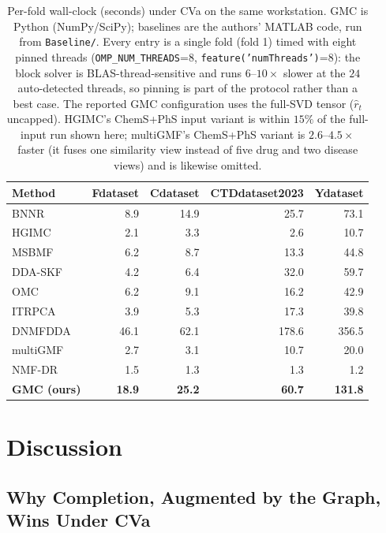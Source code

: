 \documentclass[webpdf,modern,large]{oup-authoring-template}
\begin{document}
\begin{table}[tb]
\centering
\caption{Per-fold wall-clock (seconds) under CVa on the same workstation. GMC is Python (NumPy/SciPy); baselines are the authors' MATLAB code, run from \texttt{Baseline/}. Every entry is a single fold (fold 1) timed with eight pinned threads (\texttt{OMP\_NUM\_THREADS}=8, \texttt{feature('numThreads')}=8): the block solver is BLAS-thread-sensitive and runs $6$--$10\times$ slower at the $24$ auto-detected threads, so pinning is part of the protocol rather than a best case. The reported GMC configuration uses the full-SVD tensor ($\hat r_t$ uncapped). HGIMC's ChemS+PhS input variant is within $15\%$ of the full-input run shown here; multiGMF's ChemS+PhS variant is $2.6$--$4.5\times$ faster (it fuses one similarity view instead of five drug and two disease views) and is likewise omitted.}
\label{tab:runtime}
\begin{tabular}{lrrrr}
\toprule
Method & Fdataset & Cdataset & CTDdataset2023 & Ydataset \\
\midrule
BNNR      & 8.9  & 14.9 & 25.7  & 73.1 \\
HGIMC     & 2.1  & 3.3  & 2.6   & 10.7 \\
MSBMF     & 6.2  & 8.7  & 13.3  & 44.8 \\
DDA-SKF   & 4.2  & 6.4  & 32.0  & 59.7 \\
OMC       & 6.2  & 9.1  & 16.2  & 42.9 \\
ITRPCA    & 3.9  & 5.3  & 17.3  & 39.8 \\
DNMFDDA   & 46.1 & 62.1 & 178.6 & 356.5 \\
multiGMF  & 2.7  & 3.1  & 10.7  & 20.0 \\
NMF-DR    & 1.5  & 1.3  & 1.3   & 1.2 \\
\textbf{GMC (ours)} & \textbf{18.9} & \textbf{25.2} & \textbf{60.7} & \textbf{131.8} \\
\bottomrule
\end{tabular}
\end{table}

\section{Discussion}

\subsection{Why Completion, Augmented by the Graph, Wins Under CVa}
\end{document}
